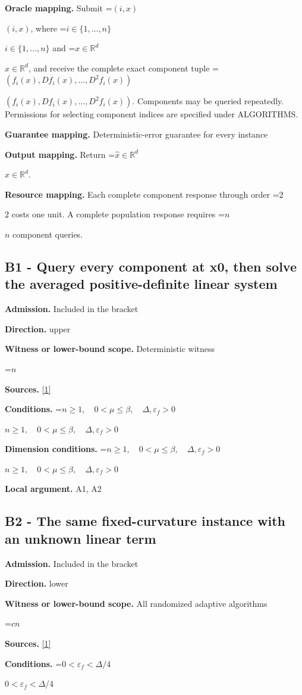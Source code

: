 \documentclass[10pt,a4paper]{article}
\newcommand{\AtlasMath}[1]{\par\begingroup\centering\setbox0=\hbox{$\displaystyle #1$}\ifdim\wd0>1.4\linewidth\typeout{ATLAS WIDE FORMULA: \the\wd0}\fi\ifdim\wd0>\linewidth\resizebox{\linewidth}{!}{\box0}\else\box0\fi\par\endgroup}
\newcommand{\AtlasInlineMath}[1]{\begingroup\setbox0=\hbox{$#1$}\ifdim\wd0>.4\linewidth\endgroup\AtlasMath{#1}\else\endgroup$#1$\fi}
\begin{document}
\textbf{Oracle mapping.} Submit \AtlasInlineMath{(i,x)}, where \AtlasInlineMath{i\in\{1,\ldots,n\}} and \AtlasInlineMath{x\in\mathbb{R}^d}, and receive the complete exact component tuple \AtlasInlineMath{(f_i(x),Df_i(x),\ldots,D^{2}f_i(x))}. Components may be queried repeatedly. Permissions for selecting component indices are specified under ALGORITHMS.

\textbf{Guarantee mapping.} Deterministic-error guarantee for every instance

\textbf{Output mapping.} Return \AtlasInlineMath{\widehat{x}\in \mathbb{R}^d}.

\textbf{Resource mapping.} Each complete component response through order \AtlasInlineMath{2} costs one unit. A complete population response requires \AtlasInlineMath{n} component queries.

\subsection{B1 - Query every component at x0, then solve the averaged positive-definite linear system}
\textbf{Admission.} Included in the bracket

\textbf{Direction.} upper

\textbf{Witness or lower-bound scope.} Deterministic witness

\AtlasMath{n}
\textbf{Sources.} \href{https://proceedings.mlr.press/v70/arjevani17a/arjevani17a.pdf}{[1]}

\textbf{Conditions.} \AtlasInlineMath{n\ge1,\quad0<\mu\le\beta,\quad\Delta,\varepsilon_f>0}

\textbf{Dimension conditions.} \AtlasInlineMath{n\ge1,\quad0<\mu\le\beta,\quad\Delta,\varepsilon_f>0}

\textbf{Local argument.} A1, A2

\subsection{B2 - The same fixed-curvature instance with an unknown linear term}
\textbf{Admission.} Included in the bracket

\textbf{Direction.} lower

\textbf{Witness or lower-bound scope.} All randomized adaptive algorithms

\AtlasMath{cn}
\textbf{Sources.} \href{https://proceedings.mlr.press/v70/arjevani17a/arjevani17a.pdf}{[1]}

\textbf{Conditions.} \AtlasInlineMath{0<\varepsilon_f<\Delta/4}
\end{document}
